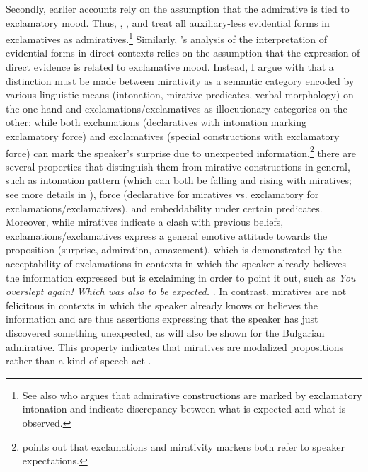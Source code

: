 \documentclass[output=paper,
colorlinks,
citecolor=brown,
newtxmath
]{langscibook}
\begin{document}
Secondly, earlier accounts rely on the assumption that the admirative is tied to exclamatory mood. Thus, \citet{Aleksova2003}, \citet{Simeonova2015}, and \citet{Sonnenhauser2015} treat all auxiliary-less evidential forms in exclamatives as admiratives.\footnote{See also \citet{Guentcheva2017} who argues that admirative constructions are marked by exclamatory intonation and indicate discrepancy between what is expected and what is observed.} Similarly, \citeauthor{Smirnova2013}'s analysis of the interpretation of evidential forms in direct contexts relies on the assumption that the expression of direct evidence is related to exclamative mood. Instead, I argue with \citet{Bustamante2013} that a distinction must be made between mirativity as a semantic category encoded by various linguistic means (intonation, mirative predicates, verbal morphology) on the one hand and exclamations/exclamatives as illocutionary categories on the other: while both exclamations (declaratives with intonation marking exclamatory force) and exclamatives (special constructions with exclamatory force) can mark the speaker's surprise due to unexpected information,\footnote{\citet{Rett2011} points out that exclamations and mirativity markers both refer to speaker expectations.} there are several properties that distinguish them from mirative constructions in general, such as intonation pattern (which can both be falling and rising with miratives; see more details in \citealt[152-153]{Bustamante2013}), force (declarative for miratives vs. exclamatory for exclamations/exclamatives), and embeddability under certain predicates. Moreover, while miratives indicate a clash with previous beliefs, %
exclamations/exclamatives express a general emotive attitude towards the proposition (surprise, admiration, amazement), which is demonstrated by the acceptability of exclamations in contexts in which the speaker already believes the information expressed but is exclaiming in order to point it out, such as \textit{You overslept again! Which was also to be expected.} \citep[149, 154--155]{Bustamante2013}. In contrast, miratives are not felicitous in contexts in which the speaker already knows or believes the information and are thus
assertions expressing that the speaker has just discovered something unexpected, as will also be shown for the Bulgarian admirative. This property indicates that miratives are modalized propositions rather than a kind of speech act \citep[159]{Bustamante2013}.
\end{document}
